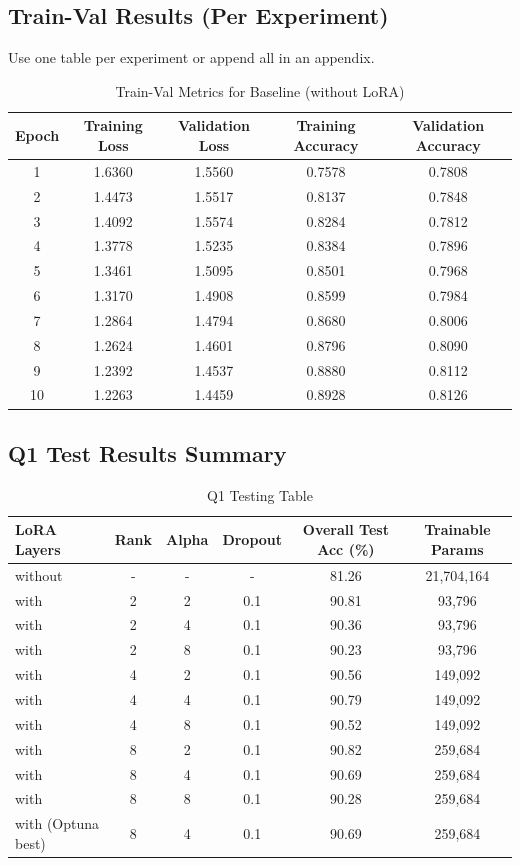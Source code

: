 \documentclass[11pt,a4paper]{article}
\begin{document}
\subsection{Train-Val Results (Per Experiment)}
Use one table per experiment or append all in an appendix.

\begin{table}[H]
\centering
\caption{Train-Val Metrics for Baseline (without LoRA)}
\begin{tabular}{c c c c c}
\toprule
Epoch & Training Loss & Validation Loss & Training Accuracy & Validation Accuracy \\
\midrule
1  & 1.6360 & 1.5560 & 0.7578 & 0.7808 \\
2  & 1.4473 & 1.5517 & 0.8137 & 0.7848 \\
3  & 1.4092 & 1.5574 & 0.8284 & 0.7812 \\
4  & 1.3778 & 1.5235 & 0.8384 & 0.7896 \\
5  & 1.3461 & 1.5095 & 0.8501 & 0.7968 \\
6  & 1.3170 & 1.4908 & 0.8599 & 0.7984 \\
7  & 1.2864 & 1.4794 & 0.8680 & 0.8006 \\
8  & 1.2624 & 1.4601 & 0.8796 & 0.8090 \\
9  & 1.2392 & 1.4537 & 0.8880 & 0.8112 \\
10 & 1.2263 & 1.4459 & 0.8928 & 0.8126 \\
\bottomrule
\end{tabular}
\end{table}

\subsection{Q1 Test Results Summary}
\begin{table}[H]
\centering
\caption{Q1 Testing Table}
\begin{tabular}{l c c c c c}
\toprule
LoRA Layers & Rank & Alpha & Dropout & Overall Test Acc (\%) & Trainable Params \\
\midrule
without & - & - & - & 81.26 & 21,704,164 \\
with & 2 & 2 & 0.1 & 90.81 & 93,796 \\
with & 2 & 4 & 0.1 & 90.36 & 93,796 \\
with & 2 & 8 & 0.1 & 90.23 & 93,796 \\
with & 4 & 2 & 0.1 & 90.56 & 149,092 \\
with & 4 & 4 & 0.1 & 90.79 & 149,092 \\
with & 4 & 8 & 0.1 & 90.52 & 149,092 \\
with & 8 & 2 & 0.1 & 90.82 & 259,684 \\
with & 8 & 4 & 0.1 & 90.69 & 259,684 \\
with & 8 & 8 & 0.1 & 90.28 & 259,684 \\
with (Optuna best) & 8 & 4 & 0.1 & 90.69 & 259,684 \\
\bottomrule
\end{tabular}
\end{table}
\end{document}
